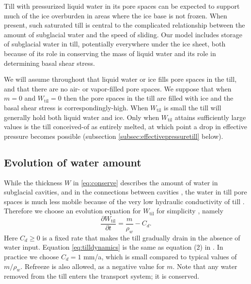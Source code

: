 \documentclass[gmd]{copernicus}   %
\newcommand{\text}{\textrm}
\newcommand{\Wtil}{W_{\text{til}}}
\begin{document}
Till with pressurized liquid water in its pore spaces can be expected to support much of the ice overburden in areas where the ice base is not frozen.  When present, such saturated till is central to the complicated relationship between the amount of subglacial water and the speed of sliding.  Our model includes storage of subglacial water in till, potentially everywhere under the ice sheet, both because of its role in conserving the mass of liquid water and its role in determining basal shear stress.

We will assume throughout that liquid water or ice fills pore spaces in the till, and that there are no air- or vapor-filled pore spaces.  We suppose that when $m=0$ and $\Wtil=0$ then the pore spaces in the till are filled with ice and the basal shear stress is correspondingly-high.  When $\Wtil$ is small the till will generally hold both liquid water and ice.  Only when $\Wtil$ attains sufficiently large values is the till conceived-of as entirely melted, at which point a drop in effective pressure becomes possible (subsection \ref{subsec:effectivepressuretill} below).

\subsection{Evolution of water amount}  While the thickness $W$ in \eqref{eq:conserve} describes the amount of water in subglacial cavities, and in the connections between cavities \citep{Kamb1987}, the water in till pore spaces is much less mobile because of the very low hydraulic conductivity of till \citep{LingleBrown1987,Tulaczyketal2000,TrufferEchelmeyerHarrison2001}.  Therefore we choose an evolution equation for $\Wtil$ for simplicity \citep{BBssasliding}, namely
\begin{equation}
\frac{\partial \Wtil}{\partial t} = \frac{m}{\rho_w} - C_d. \label{eq:tilldynamics}
\end{equation}
Here $C_d\ge 0$ is a fixed rate that makes the till gradually drain in the absence of water input.  Equation \eqref{eq:tilldynamics} is the same as equation (2) in \cite{Tulaczyketal2000b}.  In practice we choose $C_d=1$ mm/a, which is small compared to typical values of $m/\rho_w$.  Refreeze is also allowed, as a negative value for $m$.  Note that any water removed from the till enters the transport system; it is conserved.
\end{document}
